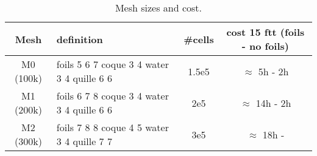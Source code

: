     \begin{table}[ht!]
        \centering\begin{tabular}{c|p{4cm}|c|c}
            Mesh & definition & \#cells & cost 15 ftt (foils - no foils)\\
            \hline
            \hline
            M0 (100k) & foils 5 6 7 \newline coque 3 4 \newline water 3 4 \newline quille 6 6 & 1.5e5 & $\approx$ 5h - 2h\\
            M1 (200k)& foils 6 7 8 \newline coque 3 4 \newline water 3 4 \newline quille 6 6 & 2e5 & $\approx$ 14h - 2h \\
            M2 (300k)& foils 7 8 8 \newline coque 4 5 \newline water 3 4 \newline quille 7 7 & 3e5 & $\approx$ 18h - \\
        \end{tabular}
        \caption{Mesh sizes and cost.}
        \label{tab:meshes}
    \end{table}





